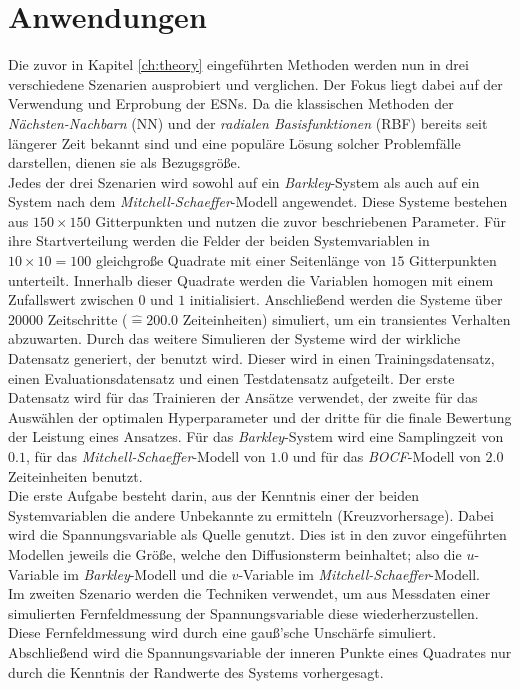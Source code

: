 \chapter{Anwendungen}
\label{ch:experiments}
Die zuvor in Kapitel \ref{ch:theory} eingeführten Methoden werden nun in drei verschiedene Szenarien ausprobiert und verglichen. Der Fokus liegt dabei auf der Verwendung und Erprobung der \textsc{ESN}s. Da die klassischen Methoden der \textit{Nächsten-Nachbarn} (\textsc{NN}) und der \textit{radialen Basisfunktionen} (\textsc{RBF}) bereits seit längerer Zeit bekannt sind und eine populäre Lösung solcher Problemfälle darstellen, dienen sie als Bezugsgröße.\\

Jedes der drei Szenarien wird sowohl auf ein \textit{Barkley}-System als auch auf ein System nach dem \textit{Mitchell-Schaeffer}-Modell angewendet. Diese Systeme bestehen aus $150 \times 150$ Gitterpunkten und nutzen die zuvor beschriebenen Parameter. Für ihre Startverteilung werden die Felder der beiden Systemvariablen in $10 \times 10 = 100$ gleichgroße Quadrate mit einer Seitenlänge von $15$ Gitterpunkten unterteilt. Innerhalb dieser Quadrate werden die Variablen homogen mit einem Zufallswert zwischen $0$ und $1$ initialisiert. Anschließend werden die Systeme über $20000$ Zeitschritte ($\widehat{=} 200.0$ Zeiteinheiten) simuliert, um ein transientes Verhalten abzuwarten. Durch das weitere Simulieren der Systeme wird der wirkliche Datensatz generiert, der benutzt wird. Dieser wird in einen Trainingsdatensatz, einen Evaluationsdatensatz und einen Testdatensatz aufgeteilt. Der erste Datensatz wird für das Trainieren der Ansätze verwendet, der zweite für das Auswählen der optimalen Hyperparameter und der dritte für die finale Bewertung der Leistung eines Ansatzes. Für das \textit{Barkley}-System wird eine Samplingzeit von $0.1$, für das \textit{Mitchell-Schaeffer}-Modell von $1.0$ und für das \textit{BOCF}-Modell von $2.0$ Zeiteinheiten benutzt.\\
 
Die erste Aufgabe besteht darin, aus der Kenntnis einer der beiden Systemvariablen die andere Unbekannte zu ermitteln (Kreuzvorhersage). Dabei wird die Spannungsvariable als Quelle genutzt. Dies ist in den zuvor eingeführten Modellen jeweils die Größe, welche den Diffusionsterm beinhaltet; also die $u$-Variable im \textit{Barkley}-Modell und die $v$-Variable im \textit{Mitchell-Schaeffer}-Modell.\\
Im zweiten Szenario werden die Techniken verwendet, um aus Messdaten einer simulierten Fernfeldmessung der Spannungsvariable  diese wiederherzustellen. Diese Fernfeldmessung wird durch eine gauß'sche Unschärfe simuliert.\\
Abschließend wird die Spannungsvariable der inneren Punkte eines Quadrates nur durch die Kenntnis der Randwerte des Systems vorhergesagt.\\

